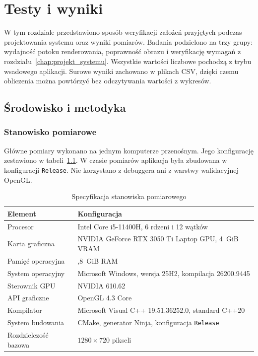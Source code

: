\chapter{Testy i wyniki}
\label{chap:testy_wyniki}

W tym rozdziale przedstawiono sposób weryfikacji założeń przyjętych podczas projektowania systemu oraz wyniki pomiarów. Badania podzielono na trzy grupy: wydajność potoku renderowania, poprawność obrazu i weryfikację wymagań z rozdziału~\ref{chap:projekt_systemu}. Wszystkie wartości liczbowe pochodzą z trybu wsadowego aplikacji. Surowe wyniki zachowano w plikach CSV, dzięki czemu obliczenia można powtórzyć bez odczytywania wartości z wykresów.

\section{Środowisko i metodyka}
\label{sec:metodyka}

\subsection{Stanowisko pomiarowe}

Główne pomiary wykonano na jednym komputerze przenośnym. Jego konfigurację zestawiono w tabeli~\ref{tab:stanowisko}. W czasie pomiarów aplikacja była zbudowana w konfiguracji \texttt{Release}. Nie korzystano z debuggera ani z warstwy walidacyjnej OpenGL.

\begin{table}[htbp]
  \centering
  \caption{Specyfikacja stanowiska pomiarowego}
  \label{tab:stanowisko}
  \small
  \renewcommand{\arraystretch}{1.15}
  \begin{tabularx}{\textwidth}{
      >{\raggedright\arraybackslash}p{}
      >{\raggedright\arraybackslash}X}
    \toprule
    \textbf{Element} & \textbf{Konfiguracja} \\
    \midrule
    Procesor & Intel Core i5-11400H, 6 rdzeni i 12 wątków \\
    Karta graficzna & NVIDIA GeForce RTX 3050 Ti Laptop GPU, 4~GiB VRAM \\
    Pamięć operacyjna & 15,8~GiB RAM \\
    System operacyjny & Microsoft Windows, wersja 25H2, kompilacja 26200.9445 \\
    Sterownik GPU & NVIDIA 610.62 \\
    API graficzne & OpenGL 4.3 Core \\
    Kompilator & Microsoft Visual C++ 19.51.36252.0, standard C++20 \\
    System budowania & CMake, generator Ninja, konfiguracja \texttt{Release} \\
    Rozdzielczość bazowa & $1280\times720$ pikseli \\
    \bottomrule
  \end{tabularx}
\end{table}

